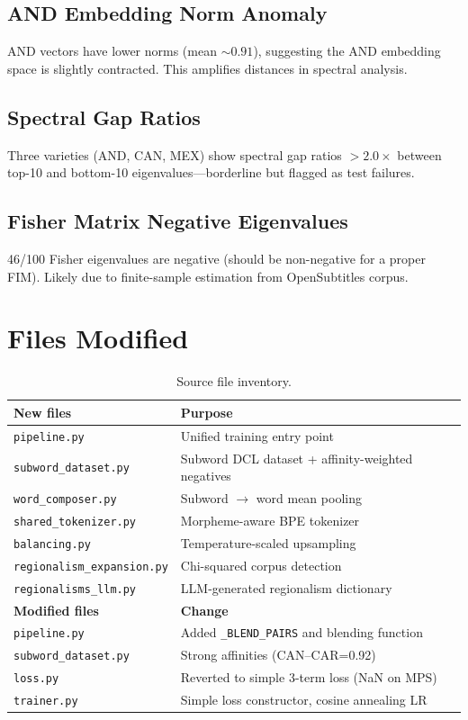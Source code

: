 \documentclass[11pt,a4paper]{article}
\begin{document}
\subsection{AND Embedding Norm Anomaly}

AND vectors have lower norms (mean ${\sim}0.91$), suggesting the AND embedding space is slightly contracted. This amplifies distances in spectral analysis.

\subsection{Spectral Gap Ratios}

Three varieties (AND, CAN, MEX) show spectral gap ratios $> 2.0\times$ between top-10 and bottom-10 eigenvalues---borderline but flagged as test failures.

\subsection{Fisher Matrix Negative Eigenvalues}

46/100 Fisher eigenvalues are negative (should be non-negative for a proper FIM). Likely due to finite-sample estimation from OpenSubtitles corpus.

\section{Files Modified}

\begin{table}[H]
\centering\small
\begin{tabular}{@{}lp{9cm}@{}}
\toprule
\textbf{New files} & \textbf{Purpose} \\
\midrule
\texttt{pipeline.py} & Unified training entry point \\
\texttt{subword\_dataset.py} & Subword DCL dataset + affinity-weighted negatives \\
\texttt{word\_composer.py} & Subword $\to$ word mean pooling \\
\texttt{shared\_tokenizer.py} & Morpheme-aware BPE tokenizer \\
\texttt{balancing.py} & Temperature-scaled upsampling \\
\texttt{regionalism\_expansion.py} & Chi-squared corpus detection \\
\texttt{regionalisms\_llm.py} & LLM-generated regionalism dictionary \\
\midrule
\textbf{Modified files} & \textbf{Change} \\
\midrule
\texttt{pipeline.py} & Added \texttt{\_BLEND\_PAIRS} and blending function \\
\texttt{subword\_dataset.py} & Strong affinities (CAN--CAR=0.92) \\
\texttt{loss.py} & Reverted to simple 3-term loss (NaN on MPS) \\
\texttt{trainer.py} & Simple loss constructor, cosine annealing LR \\
\bottomrule
\end{tabular}
\caption{Source file inventory.}
\end{table}
\end{document}
